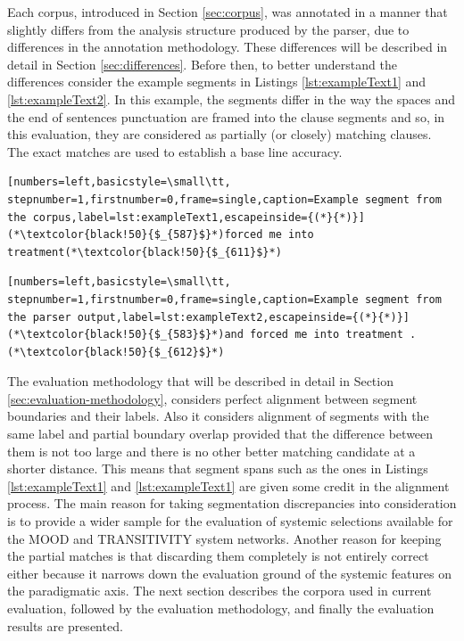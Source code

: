     Each corpus, introduced in Section \ref{sec:corpus}, was annotated in a manner that slightly differs from the analysis structure produced by the parser, due to differences in the annotation methodology. These differences will be described in detail in Section \ref{sec:differences}. Before then, to better understand the differences consider the example segments in Listings \ref{lst:exampleText1} and \ref{lst:exampleText2}. In this example, the segments differ in the way the spaces and the end of sentences punctuation are framed into the clause segments and so, in this evaluation, they are considered as partially (or closely) matching clauses. The exact matches are used to establish a base line accuracy. 
    
\noindent
\begin{minipage}{\linewidth}
\begin{lstlisting}[numbers=left,basicstyle=\small\tt, stepnumber=1,firstnumber=0,frame=single,caption=Example segment from the corpus,label=lst:exampleText1,escapeinside={(*}{*)}]
(*\textcolor{black!50}{$_{587}$}*)forced me into treatment(*\textcolor{black!50}{$_{611}$}*)
\end{lstlisting}
\end{minipage}

\noindent
\begin{minipage}{\linewidth}
\begin{lstlisting}[numbers=left,basicstyle=\small\tt, stepnumber=1,firstnumber=0,frame=single,caption=Example segment from the parser output,label=lst:exampleText2,escapeinside={(*}{*)}]
(*\textcolor{black!50}{$_{583}$}*)and forced me into treatment .(*\textcolor{black!50}{$_{612}$}*)
\end{lstlisting}
\end{minipage}    

    The evaluation methodology that will be described in detail in Section \ref{sec:evaluation-methodology}, considers perfect alignment between segment boundaries and their labels. Also it considers alignment of segments with the same label and partial boundary overlap provided that the difference between them is not too large and there is no other better matching candidate at a shorter distance. This means that segment spans such as the ones in Listings \ref{lst:exampleText1} and \ref{lst:exampleText1} are given some credit in the alignment process. The main reason for taking segmentation discrepancies into consideration is to provide a wider sample for the evaluation of systemic selections available for the MOOD and TRANSITIVITY system networks. Another reason for keeping the partial matches is that discarding them completely is not entirely correct either because it narrows down the evaluation ground of the systemic features on the paradigmatic axis. The next section describes the corpora used in current evaluation, followed by the evaluation methodology, and finally the evaluation results are presented.

